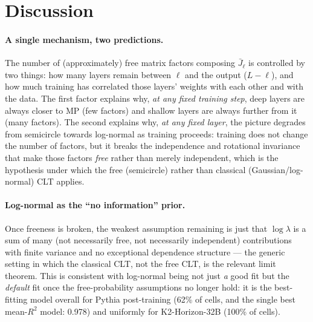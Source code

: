 \documentclass[11pt,a4paper]{article}
\begin{document}
\section{Discussion}

\paragraph{A single mechanism, two predictions.} The number of (approximately) free matrix factors composing $\bar{J}_\ell$ is controlled by two things: how many layers remain between $\ell$ and the output ($L-\ell$), and how much training has correlated those layers' weights with each other and with the data. The first factor explains why, \emph{at any fixed training step}, deep layers are always closer to MP (few factors) and shallow layers are always further from it (many factors). The second explains why, \emph{at any fixed layer}, the picture degrades from semicircle towards log-normal as training proceeds: training does not change the number of factors, but it breaks the independence and rotational invariance that make those factors \emph{free} rather than merely independent, which is the hypothesis under which the free (semicircle) rather than classical (Gaussian/log-normal) CLT applies.

\paragraph{Log-normal as the ``no information'' prior.} Once freeness is broken, the weakest assumption remaining is just that $\log\lambda$ is a sum of many (not necessarily free, not necessarily independent) contributions with finite variance and no exceptional dependence structure --- the generic setting in which the classical CLT, not the free CLT, is the relevant limit theorem. This is consistent with log-normal being not just \emph{a} good fit but the \emph{default} fit once the free-probability assumptions no longer hold: it is the best-fitting model overall for Pythia post-training (62\% of cells, and the single best mean-$R^2$ model: 0.978) and uniformly for K2-Horizon-32B (100\% of cells).
\end{document}
